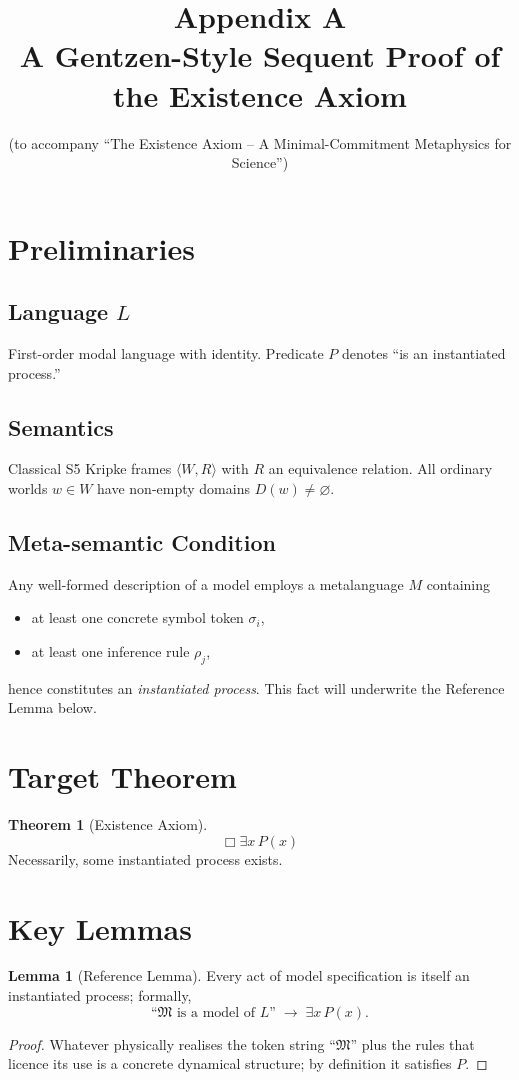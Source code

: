 \documentclass[11pt]{article}
\title{Appendix A\\A Gentzen-Style Sequent Proof of the Existence Axiom}
\author{(to accompany “The Existence Axiom – A Minimal-Commitment Metaphysics for Science”)}
\date{}
\newcommand{\bx}{\Box}
\theoremstyle{definition}
\newtheorem{lemma}{Lemma}[section]
\newtheorem{theorem}{Theorem}[section]
\begin{document}
\maketitle
\tableofcontents
\newpage

\section{Preliminaries}

\subsection{Language $L$}
First-order modal language with identity.  
Predicate $P$ denotes “is an instantiated process.”  

\subsection{Semantics}
Classical S5 Kripke frames $\langle W,R\rangle$ with $R$ an equivalence relation.  
All ordinary worlds $w\in W$ have non-empty domains $D(w)\neq\varnothing$.  

\subsection{Meta-semantic Condition}
Any well-formed description of a model employs a metalanguage $M$ containing
\begin{itemize}
\item at least one concrete symbol token $\sigma_i$,
\item at least one inference rule $\rho_j$,
\end{itemize}
hence constitutes an \emph{instantiated process}.  
This fact will underwrite the Reference Lemma below.

\section{Target Theorem}

\begin{theorem}[Existence Axiom]\label{thm:EA}
\[
\bx\exists x\,P(x)
\]
Necessarily, some instantiated process exists.
\end{theorem}

\section{Key Lemmas}

\begin{lemma}[Reference Lemma]\label{lem:ref}
Every act of model specification is itself an instantiated process; formally,
\[ \text{``$\mathfrak{M}$ is a model of $L$''}\;\rightarrow\; \exists x\,P(x).\]
\end{lemma}
\begin{proof}
Whatever physically realises the token string “$\mathfrak{M}$” plus the rules that licence its use is a concrete dynamical structure; by definition it satisfies $P$.
\end{proof}
\end{document}
